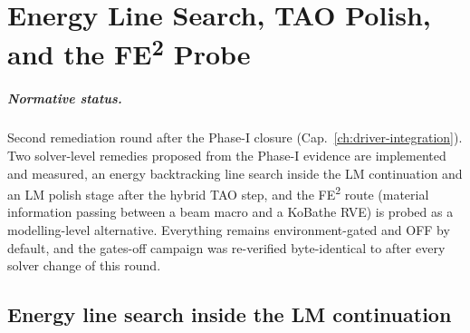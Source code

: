 
\chapter{Energy Line Search, TAO Polish, and the FE\textsuperscript{2} Probe}
\label{ch:energy-linesearch-fe2}

\paragraph{Normative status.}
Second remediation round after the Phase-I closure
(Cap.~\ref{ch:driver-integration}). Two solver-level remedies proposed
from the Phase-I evidence are implemented and measured, an energy
backtracking line search inside the LM continuation and an LM polish
stage after the hybrid TAO step, and the FE\textsuperscript{2} route
(material information passing between a beam macro and a KoBathe RVE) is
probed as a modelling-level alternative. Everything remains
environment-gated and OFF by default, and the gates-off campaign was
re-verified byte-identical to  after every
solver change of this round.

\section{Energy line search inside the LM continuation}
\label{sec:ls-theory}


